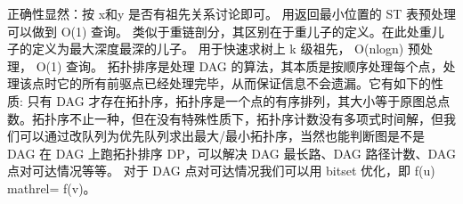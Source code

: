 {}正确性显然：按\markdownRendererDollarSign{} x和y \markdownRendererDollarSign{}是否有祖先关系讨论即可。\markdownRendererParagraphSeparator
{}用返回最小位置的\markdownRendererDollarSign{} ST \markdownRendererDollarSign{}表预处理可以做到\markdownRendererDollarSign{} O(1) \markdownRendererDollarSign{}查询。\markdownRendererInterblockSeparator
{}\markdownRendererInterblockSeparator
{}
\markdownRendererSectionEnd \markdownRendererSectionBegin
{}\markdownRendererInterblockSeparator
{}类似于重链剖分，其区别在于重儿子的定义。在此处重儿子的定义为最大深度最深的儿子。\markdownRendererParagraphSeparator
{}用于快速求树上\markdownRendererDollarSign{} k \markdownRendererDollarSign{}级祖先，\markdownRendererDollarSign{} O(nlogn) \markdownRendererDollarSign{}预处理，\markdownRendererDollarSign{} O(1) \markdownRendererDollarSign{}查询。\markdownRendererInterblockSeparator
{}\markdownRendererInterblockSeparator
{}
\markdownRendererSectionEnd 
\markdownRendererSectionEnd \markdownRendererSectionBegin
{}\markdownRendererInterblockSeparator
{}拓扑排序是处理\markdownRendererDollarSign{} DAG \markdownRendererDollarSign{}的算法，其本质是按顺序处理每个点，处理该点时它的所有前驱点已经处理完毕，从而保证信息不会遗漏。它有如下的性质:\markdownRendererParagraphSeparator
{}只有\markdownRendererDollarSign{} DAG \markdownRendererDollarSign{}才存在拓扑序，拓扑序是一个点的有序排列，其大小等于原图总点数。拓扑序不止一种，但在没有特殊性质下，拓扑序计数没有多项式时间解，但我们可以通过改队列为优先队列求出最大/最小拓扑序，当然也能判断图是不是\markdownRendererDollarSign{} DAG \markdownRendererDollarSign{}\markdownRendererParagraphSeparator
{}在 \markdownRendererDollarSign{}DAG\markdownRendererDollarSign{} 上跑拓扑排序 \markdownRendererDollarSign{}DP\markdownRendererDollarSign{}，可以解决 \markdownRendererDollarSign{}DAG\markdownRendererDollarSign{} 最长路、\markdownRendererDollarSign{}DAG\markdownRendererDollarSign{} 路径计数、\markdownRendererDollarSign{}DAG\markdownRendererDollarSign{} 点对可达情况等等。\markdownRendererParagraphSeparator
{}对于 \markdownRendererDollarSign{}DAG\markdownRendererDollarSign{} 点对可达情况我们可以用 bitset 优化，即 \markdownRendererDollarSign{}f(u) \markdownRendererBackslash{}mathrel\markdownRendererLeftBrace{}\markdownRendererPipe{}\markdownRendererRightBrace{}= f(v)\markdownRendererDollarSign{}。\markdownRendererInterblockSeparator
